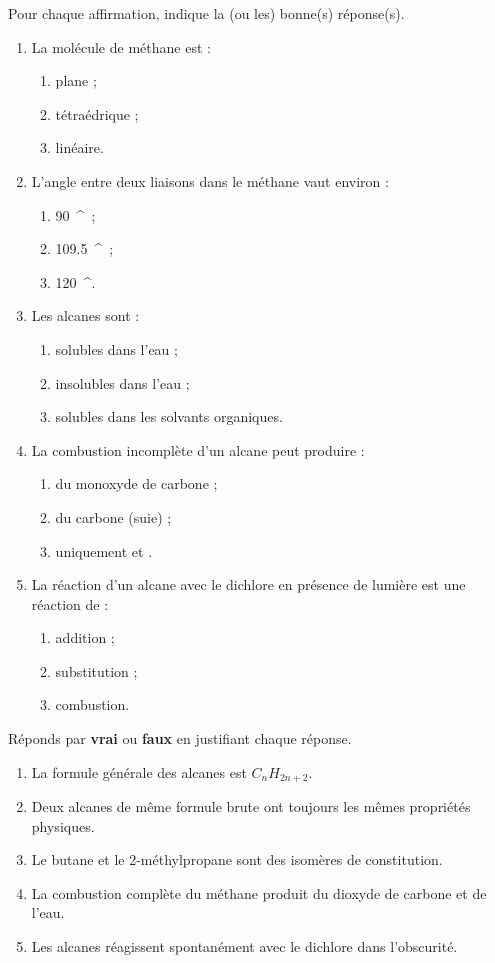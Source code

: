 \documentclass[11pt]{article}
\providecommand{\degree}{^{\circ}}
\begin{document}
\begin{exercice}
Pour chaque affirmation, indique la (ou les) bonne(s) réponse(s).
\begin{enumerate}
\item La molécule de méthane  est :
\begin{enumerate}
\item plane ; \item tétraédrique ; \item linéaire.
\end{enumerate}
\item L'angle entre deux liaisons  dans le méthane vaut environ :
\begin{enumerate}
\item \SI{90}{\degree} ; \item \SI{109,5}{\degree} ; \item \SI{120}{\degree}.
\end{enumerate}
\item Les alcanes sont :
\begin{enumerate}
\item solubles dans l'eau ; \item insolubles dans l'eau ; \item solubles dans les solvants organiques.
\end{enumerate}
\item La combustion incomplète d'un alcane peut produire :
\begin{enumerate}
\item du monoxyde de carbone  ; \item du carbone (suie) ; \item uniquement  et .
\end{enumerate}
\item La réaction d'un alcane avec le dichlore en présence de lumière est une réaction de :
\begin{enumerate}
\item addition ; \item substitution ; \item combustion.
\end{enumerate}
\end{enumerate}
\end{exercice}

\begin{exercice}
Réponds par \textbf{vrai} ou \textbf{faux} en justifiant chaque réponse.
\begin{enumerate}
\item La formule générale des alcanes est $C_nH_{2n+2}$.
\item Deux alcanes de même formule brute ont toujours les mêmes propriétés physiques.
\item Le butane et le 2-méthylpropane sont des isomères de constitution.
\item La combustion complète du méthane produit du dioxyde de carbone et de l'eau.
\item Les alcanes réagissent spontanément avec le dichlore dans l'obscurité.
\end{enumerate}
\end{exercice}
\end{document}
